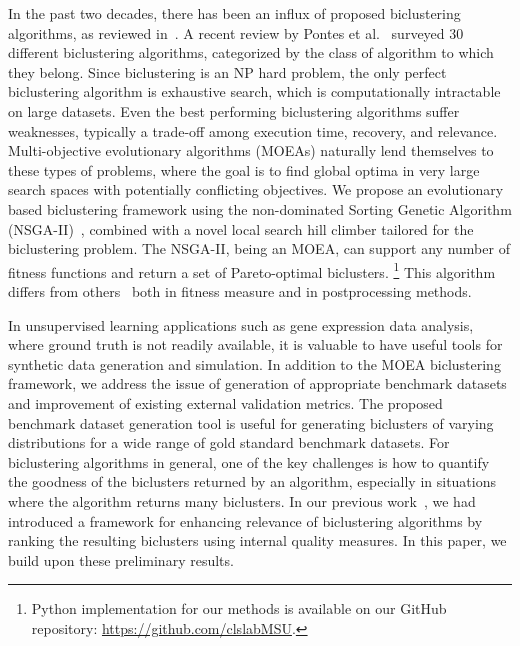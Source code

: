 In the past two decades, there has been an influx of proposed biclustering algorithms, as reviewed in~\cite{prelic2006systematic, eren2012comparative, oghabian2014biclustering, pontes2015biclustering, roy2016analysis}.
A recent review by Pontes et al.~\cite{pontes2015biclustering} surveyed 30 different biclustering algorithms, categorized by the class of algorithm to which they belong.
Since biclustering is an NP hard problem, the only perfect biclustering algorithm is exhaustive search, which is computationally intractable on large datasets.
Even the best performing biclustering algorithms suffer weaknesses, typically a trade-off among execution time, recovery, and relevance.
Multi-objective evolutionary algorithms (MOEAs) naturally lend themselves to these types of problems, where the goal is to find global optima in very large search spaces with potentially conflicting objectives. %
We propose an evolutionary based biclustering framework using the non-dominated Sorting Genetic Algorithm (NSGA-II)~\cite{deb2002fast}, combined with a novel local search hill climber tailored for the biclustering problem. The NSGA-II, being an MOEA, can support any number of fitness functions and return a set of Pareto-optimal biclusters.
\footnote{Python implementation for our methods is available on our GitHub repository: \url{https://github.com/clslabMSU}.}
This algorithm differs from others~\cite{pontes2013configurable, mitra2006multi} both in fitness measure and in postprocessing methods.

In unsupervised learning applications such as gene expression data analysis, where ground truth is not readily available, it is valuable to have useful tools for synthetic data generation and simulation.
In addition to the MOEA biclustering framework, we address the issue of generation of appropriate benchmark datasets and improvement of existing external validation metrics.
The proposed benchmark dataset generation tool is useful for generating biclusters of varying distributions for a wide range of gold standard benchmark datasets.
For biclustering algorithms in general, one of the key challenges is how to quantify the goodness of the biclusters returned by an algorithm, especially in situations where the algorithm returns many biclusters. In our previous work~\cite{icpram18}, we had introduced a framework for enhancing relevance of biclustering algorithms by ranking the resulting biclusters using internal quality measures.
In this paper, we build upon these preliminary results.

